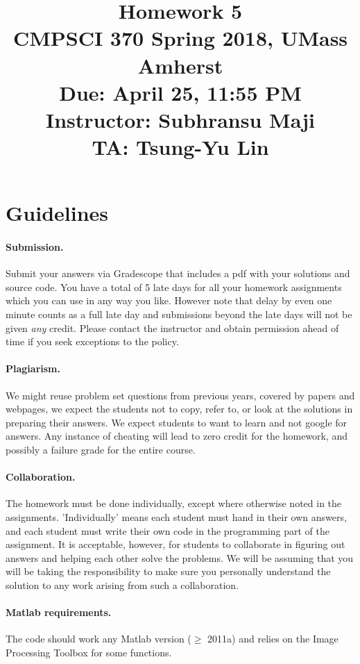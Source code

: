 \documentclass[10pt,letterpaper]{article}
\title{
  Homework 5 \\
  \Large{CMPSCI 370 Spring 2018, UMass Amherst} \\
  \Large{Due: April 25, 11:55 PM} \\
  \Large{Instructor: Subhransu Maji} \\
  \Large{TA: Tsung-Yu Lin}
}
\date{}
\begin{document}
\maketitle

\renewcommand\thesubsection{\thesection.\alph{subsection}}


\section*{Guidelines}


\paragraph{Submission.} Submit your answers via Gradescope that includes a pdf with your solutions and source code. You have a total of 5 late days for all your homework assignments which you can use in any way you like. However note that delay by even one minute counts as a full late day and submissions beyond the late days will not be given \emph{any} credit. Please contact the instructor and obtain permission ahead of time if you seek exceptions to the policy.

\paragraph{Plagiarism.} We might reuse problem set questions from previous years, covered by papers and webpages, we expect the students not to copy, refer to, or look at the solutions in preparing their answers. We expect students to want to learn and not google for answers. Any instance of cheating will lead to zero credit for the homework, and possibly a failure grade for the entire course.

\paragraph{Collaboration.} The homework must be done individually, except where otherwise noted in the assignments. 'Individually' means each student must hand in their own answers, and each student must write their own code in the programming part of the assignment. It is acceptable, however, for students to collaborate in figuring out answers and helping each other solve the problems. We will be assuming that you will be taking the responsibility to make sure you personally understand the solution to any work arising from such a collaboration.

\paragraph{Matlab requirements.} The code should work any Matlab version ($\geq$ 2011a) and relies on the Image Processing Toolbox for some functions.
\end{document}
